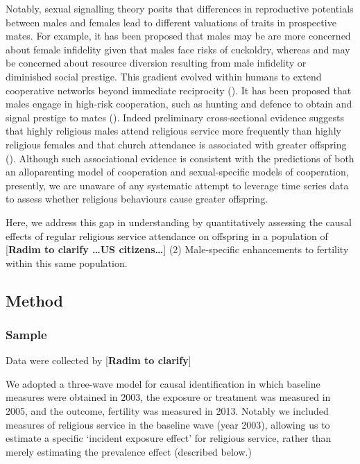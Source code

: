 \documentclass[
  single column]{article}
\begin{document}
Notably, sexual signalling theory posits that differences in
reproductive potentials between males and females lead to different
valuations of traits in prospective mates. For example, it has been
proposed that males may be are more concerned about female infidelity
given that males face risks of cuckoldry, whereas and may be concerned
about resource diversion resulting from male infidelity or diminished
social prestige. This gradient evolved within humans to extend
cooperative networks beyond immediate reciprocity
(). It has been
proposed that males engage in high-risk cooperation, such as hunting and
defence to obtain and signal prestige to mates
(). Indeed preliminary
cross-sectional evidence suggests that highly religious males attend
religious service more frequently than highly religious females and that
church attendance is associated with greater offspring
(). Although such
associational evidence is consistent with the predictions of both an
alloparenting model of cooperation and sexual-specific models of
cooperation, presently, we are unaware of any systematic attempt to
leverage time series data to assess whether religious behaviours cause
greater offspring.

Here, we address this gap in understanding by quantitatively assessing
the causal effects of regular religious service attendance on offspring
in a population of {[}\textbf{Radim to clarify \ldots US
citizens\ldots{}}{]} (2) Male-specific enhancements to fertility within
this same population.

\subsection{Method}\label{method}

\subsubsection{Sample}\label{sample}

Data were collected by {[}\textbf{Radim to clarify}{]}

We adopted a three-wave model for causal identification in which
baseline measures were obtained in 2003, the exposure or treatment was
measured in 2005, and the outcome, fertility was measured in 2013.
Notably we included measures of religious service in the baseline wave
(year 2003), allowing us to estimate a specific `incident exposure
effect' for religious service, rather than merely estimating the
prevalence effect (described below.)
\end{document}
